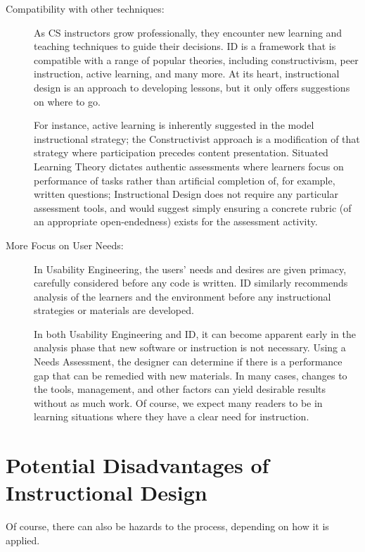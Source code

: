 \begin{description}
\item[Compatibility with other techniques:]
As CS instructors grow professionally, they encounter new learning and teaching techniques to guide their decisions.
ID is a framework that is compatible with a range of popular theories, including constructivism, peer instruction, active learning, and many more.
At its heart, instructional design is an approach to developing lessons, but it only offers suggestions on where to go.

For instance, active learning is inherently suggested in the model instructional strategy; the Constructivist approach is a modification of that strategy where participation precedes content presentation.
Situated Learning Theory dictates authentic assessments where learners focus on performance of tasks rather than artificial completion of, for example, written questions; Instructional Design does not require any particular assessment tools, and would suggest simply ensuring a concrete rubric (of an appropriate open-endedness) exists for the assessment activity.

\item[More Focus on User Needs:]
In Usability Engineering, the users' needs and desires are given primacy, carefully considered before any code is written.
ID similarly recommends analysis of the learners and the environment before any instructional strategies or materials are developed.

In both Usability Engineering and ID, it can become apparent early in the analysis phase that new software or instruction is not necessary.
Using a Needs Assessment, the designer can determine if there is a performance gap that can be remedied with new materials.
In many cases, changes to the tools, management, and other factors can yield desirable results without as much work.
Of course, we expect many readers to be in learning situations where they have a clear need for instruction.

\end{description}


\section{Potential Disadvantages of Instructional Design}

Of course, there can also be hazards to the process, depending on how it is applied.


